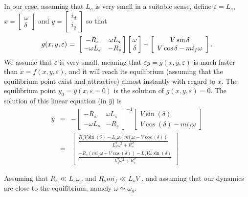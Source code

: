 \documentclass[conference]{IEEEtran}
\renewcommand{\o}    {{\omega}}
\newcommand{\e}      {{\varepsilon}}
\newcommand{\m}      {{\hbox{\hskip 1pt}}}
\newcommand{\nm}     {{\hbox{\hskip -3pt}}}
\begin{document}
In our case, assuming that $L_s$ is very small in a suitable sense,
define $\e=L_s$, $x=\left[\begin{array}{c} \o\\ \delta\end{array}
\right]$ and $y=\left[\begin{array}{c} i_d\\ i_q \end{array}\right]$
so that
$$ g(x,y,\e) \m=\m \left[\nm \begin{array}{cc} -R_s & \o L_s\\ -\o 
   L_s & -R_s \end{array}\nm\right] \left[\nm \begin{array}{c} \o\\ 
   \delta \end{array} \nm\right]+\left[\begin{array}{c} V\sin\delta\\ 
   V\cos\delta - mi_f\o \end{array}\right].$$
We assume that $\e$ is very small, meaning that $\e\dot{y}=g(x,y,\e)$
is much faster than $\dot{x}=f(x,y,\e)$, and it will reach its
equilibrium (assuming that the equilibrium point exist and attractive)
almost instantly with regard to $x$.  The equilibrium point
$y_{0}=\hat{y}(x,\e=0)$ is the solution of $g(x,y,\e)=0$. The solution
of this linear equation (in $\hat{y}$) is
\[
\begin{array}{ccc}
\hat{y} & = & -\left[\begin{array}{cc}
-R_{s} & \omega L_{s}\\
-\omega L_{s} & -R_{s}
\end{array}\right]^{-1}\left[\begin{array}{c}
V\sin(\delta)\\
V\cos(\delta)-mi_{f}\omega
\end{array}\right]\\
 & = & \left[\begin{array}{c}
\frac{R_{s}V\sin(\delta)-L_{s}\omega\left(mi_{f}\omega-V\cos(\delta)\right)}{L_{s}^{2}\omega^{2}+R_{s}^{2}}\\
\frac{-R_{s}\left(mi_{f}\omega-V\cos(\delta)\right)-L_{s}V\omega\sin(\delta)}{L_{s}^{2}\omega^{2}+R_{s}^{2}}
\end{array}\right]
\end{array}
\]


Assuming that $R_{s}\ll L_{s}\omega_{g}$ and $R_{s}mi_{f}\ll L_{s}V$
, and assuming that our dynamics are close to the equilibrium, namely
$\omega\simeq\omega_{g}$. 
\end{document}
